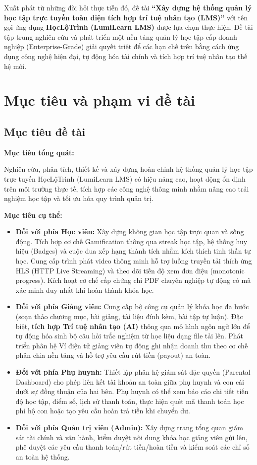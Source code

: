 \documentclass[../main.tex]{subfiles}
\begin{document}
Xuất phát từ những đòi hỏi thực tiễn đó, đề tài \textbf{``Xây dựng hệ thống quản lý học tập trực tuyến toàn diện tích hợp trí tuệ nhân tạo (LMS)''} với tên gọi ứng dụng \textbf{HọcLộTrình (LumiLearn LMS)} được lựa chọn thực hiện. Đề tài tập trung nghiên cứu và phát triển một nền tảng quản lý học tập cấp doanh nghiệp (Enterprise-Grade) giải quyết triệt để các hạn chế trên bằng cách ứng dụng công nghệ hiện đại, tự động hóa tài chính và tích hợp trí tuệ nhân tạo thế hệ mới.

\section{Mục tiêu và phạm vi đề tài}
\label{sec:MucTieuPhamVi}

\subsection{Mục tiêu đề tài}
\label{subsec:MucTieu}

\textbf{Mục tiêu tổng quát:}

Nghiên cứu, phân tích, thiết kế và xây dựng hoàn chỉnh hệ thống quản lý học tập trực tuyến HọcLộTrình (LumiLearn LMS) có hiệu năng cao, hoạt động ổn định trên môi trường thực tế, tích hợp các công nghệ thông minh nhằm nâng cao trải nghiệm học tập và tối ưu hóa quy trình quản trị.

\textbf{Mục tiêu cụ thể:}
\begin{itemize}
    \item \textbf{Đối với phía Học viên:} Xây dựng không gian học tập trực quan và sống động. Tích hợp cơ chế Gamification thông qua streak học tập, hệ thống huy hiệu (Badges) và cuộc đua xếp hạng thành tích nhằm kích thích tinh thần tự học. Cung cấp trình phát video thông minh hỗ trợ luồng truyền tải thích ứng HLS (HTTP Live Streaming) và theo dõi tiến độ xem đơn điệu (monotonic progress). Kích hoạt cơ chế cấp chứng chỉ PDF chuyên nghiệp tự động có mã xác minh duy nhất khi hoàn thành khóa học.
    \item \textbf{Đối với phía Giảng viên:} Cung cấp bộ công cụ quản lý khóa học đa bước (soạn thảo chương mục, bài giảng, tài liệu đính kèm, bài tập tự luận). Đặc biệt, \textbf{tích hợp Trí tuệ nhân tạo (AI)} thông qua mô hình ngôn ngữ lớn để tự động hóa sinh bộ câu hỏi trắc nghiệm từ học liệu dạng file tải lên. Phát triển phân hệ Ví điện tử giảng viên tự động ghi nhận doanh thu theo cơ chế phân chia nền tảng và hỗ trợ yêu cầu rút tiền (payout) an toàn.
    \item \textbf{Đối với phía Phụ huynh:} Thiết lập phân hệ giám sát đặc quyền (Parental Dashboard) cho phép liên kết tài khoản an toàn giữa phụ huynh và con cái dưới sự đồng thuận của hai bên. Phụ huynh có thể xem báo cáo chi tiết tiến độ học tập, điểm số, lịch sử thanh toán, thực hiện quét mã thanh toán học phí hộ con hoặc tạo yêu cầu hoàn trả tiền khi chuyển dư.
    \item \textbf{Đối với phía Quản trị viên (Admin):} Xây dựng trang tổng quan giám sát tài chính và vận hành, kiểm duyệt nội dung khóa học giảng viên gửi lên, phê duyệt các yêu cầu thanh toán/rút tiền/hoàn tiền và kiểm soát các chỉ số an toàn hệ thống.
\end{itemize}
\end{document}
